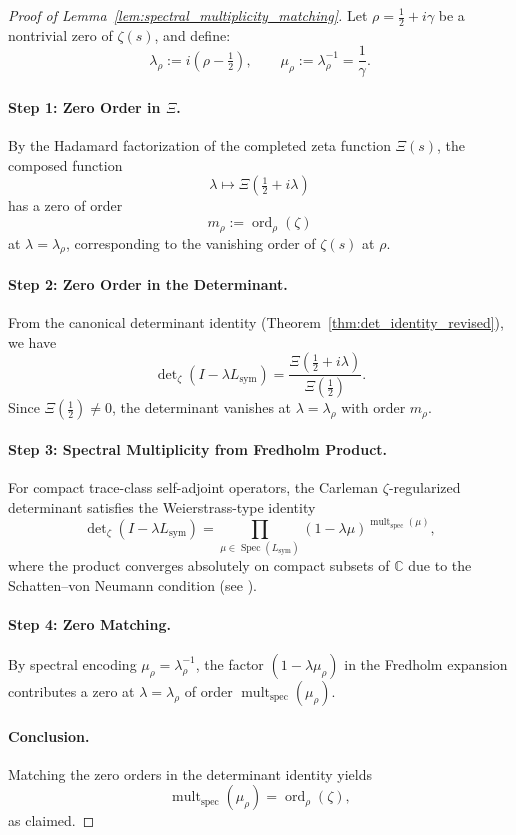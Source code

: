 \begin{proof}[Proof of Lemma~\ref{lem:spectral_multiplicity_matching}]
Let \( \rho = \tfrac{1}{2} + i\gamma \) be a nontrivial zero of \( \zeta(s) \), and define:
\[
\lambda_\rho := i(\rho - \tfrac{1}{2}), \qquad \mu_\rho := \lambda_\rho^{-1} = \frac{1}{\gamma}.
\]

\paragraph{Step 1: Zero Order in \texorpdfstring{\( \Xi \)}{Ξ}.}
By the Hadamard factorization of the completed zeta function \( \Xi(s) \), the composed function
\[
\lambda \mapsto \Xi\left( \tfrac{1}{2} + i\lambda \right)
\]
has a zero of order
\[
m_\rho := \operatorname{ord}_\rho(\zeta)
\]
at \( \lambda = \lambda_\rho \), corresponding to the vanishing order of \( \zeta(s) \) at \( \rho \).

\paragraph{Step 2: Zero Order in the Determinant.}
From the canonical determinant identity (Theorem~\ref{thm:det_identity_revised}), we have
\[
\det\nolimits_\zeta(I - \lambda L_{\mathrm{sym}}) = \frac{\Xi(\tfrac{1}{2} + i\lambda)}{\Xi(\tfrac{1}{2})}.
\]
Since \( \Xi(\tfrac{1}{2}) \neq 0 \), the determinant vanishes at \( \lambda = \lambda_\rho \) with order \( m_\rho \).

\paragraph{Step 3: Spectral Multiplicity from Fredholm Product.}
For compact trace-class self-adjoint operators, the Carleman \(\zeta\)-regularized determinant satisfies the Weierstrass-type identity
\[
\det\nolimits_\zeta(I - \lambda L_{\mathrm{sym}})
= \prod_{\mu \in \operatorname{Spec}(L_{\mathrm{sym}})} (1 - \lambda \mu)^{\operatorname{mult}_{\mathrm{spec}}(\mu)},
\]
where the product converges absolutely on compact subsets of \( \mathbb{C} \) due to the Schatten–von Neumann condition (see \cite[Theorem 4.2]{Simon2005TraceIdeals}).

\paragraph{Step 4: Zero Matching.}
By spectral encoding \( \mu_\rho = \lambda_\rho^{-1} \), the factor \( (1 - \lambda \mu_\rho) \) in the Fredholm expansion contributes a zero at \( \lambda = \lambda_\rho \) of order \( \operatorname{mult}_{\mathrm{spec}}(\mu_\rho) \).

\paragraph{Conclusion.}
Matching the zero orders in the determinant identity yields
\[
\operatorname{mult}_{\mathrm{spec}}(\mu_\rho) = \operatorname{ord}_\rho(\zeta),
\]
as claimed.
\end{proof}
% 
